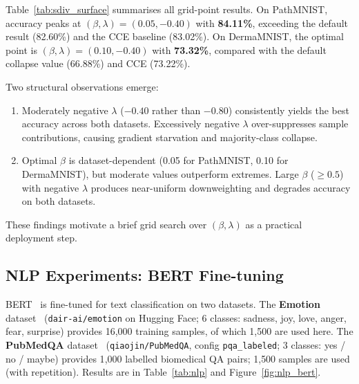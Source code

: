 Table~\ref{tab:sdiv_surface} summarises all grid-point results.
On PathMNIST, accuracy peaks at
$(\beta, \lambda) = (0.05, -0.40)$ with \textbf{84.11\%},
exceeding the default result (82.60\%) and the CCE baseline (83.02\%).
On DermaMNIST, the optimal point is
$(\beta, \lambda) = (0.10, -0.40)$ with \textbf{73.32\%},
compared with the default collapse value (66.88\%) and CCE (73.22\%).

Two structural observations emerge:
\begin{enumerate}[leftmargin=*,itemsep=2pt]
  \item Moderately negative $\lambda$ ($-0.40$ rather than $-0.80$)
        consistently yields the best accuracy across both datasets.
        Excessively negative $\lambda$ over-suppresses sample contributions,
        causing gradient starvation and majority-class collapse.
  \item Optimal $\beta$ is dataset-dependent (0.05 for PathMNIST,
        0.10 for DermaMNIST), but moderate values outperform extremes.
        Large $\beta$ ($\geq0.5$) with negative $\lambda$ produces
        near-uniform downweighting and degrades accuracy on both datasets.
\end{enumerate}
These findings motivate a brief grid search over $(\beta, \lambda)$ as
a practical deployment step.

\subsection{NLP Experiments: BERT Fine-tuning}
\label{sec:nlp}

BERT~\citep{devlin2019} is fine-tuned for text classification on two datasets.
The \textbf{Emotion} dataset~\citep{saravia2018}
(\texttt{dair-ai/emotion} on Hugging Face;
6 classes: sadness, joy, love, anger, fear, surprise)
provides 16{,}000 training samples, of which 1{,}500 are used here.
The \textbf{PubMedQA} dataset~\citep{PubMedQA}
(\texttt{qiaojin/PubMedQA}, config \texttt{pqa\_labeled};
3 classes: yes / no / maybe)
provides 1{,}000 labelled biomedical QA pairs;
1{,}500 samples are used (with repetition).
Results are in Table~\ref{tab:nlp} and Figure~\ref{fig:nlp_bert}.

